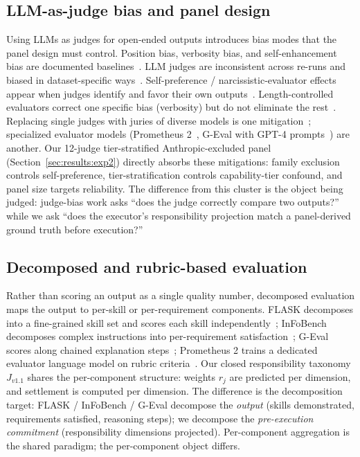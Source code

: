 \subsection{LLM-as-judge bias and panel design}
\label{sec:related:judge_bias}

Using LLMs as judges for open-ended outputs introduces bias modes that the panel design must control. Position bias, verbosity bias, and self-enhancement bias are documented baselines~\cite{zheng2023mtbench, wang2023notfair}. LLM judges are inconsistent across re-runs and biased in dataset-specific ways~\cite{stureborg2024inconsistent}. Self-preference / narcissistic-evaluator effects appear when judges identify and favor their own outputs~\cite{panickssery2024selfpref, koo2024narcissistic, wataoka2024selfpreference}. Length-controlled evaluators correct one specific bias (verbosity) but do not eliminate the rest~\cite{dubois2024lengthcontrolled}. Replacing single judges with juries of diverse models is one mitigation~\cite{verga2024juries}; specialized evaluator models (Prometheus 2~\cite{kim2024prometheus2}, G-Eval with GPT-4 prompts~\cite{liu2023geval}) are another. Our 12-judge tier-stratified Anthropic-excluded panel (Section~\ref{sec:results:exp2}) directly absorbs these mitigations: family exclusion controls self-preference, tier-stratification controls capability-tier confound, and panel size targets reliability. The difference from this cluster is the object being judged: judge-bias work asks ``does the judge correctly compare two outputs?'' while we ask ``does the executor's responsibility projection match a panel-derived ground truth before execution?''

\subsection{Decomposed and rubric-based evaluation}
\label{sec:related:decomposed}

Rather than scoring an output as a single quality number, decomposed evaluation maps the output to per-skill or per-requirement components. FLASK decomposes into a fine-grained skill set and scores each skill independently~\cite{ye2024flask}; InFoBench decomposes complex instructions into per-requirement satisfaction~\cite{qin2024infobench}; G-Eval scores along chained explanation steps~\cite{liu2023geval}; Prometheus 2 trains a dedicated evaluator language model on rubric criteria~\cite{kim2024prometheus2}. Our closed responsibility taxonomy $J_{v1.1}$ shares the per-component structure: weights $r_j$ are predicted per dimension, and settlement is computed per dimension. The difference is the decomposition target: FLASK / InFoBench / G-Eval decompose the \emph{output} (skills demonstrated, requirements satisfied, reasoning steps); we decompose the \emph{pre-execution commitment} (responsibility dimensions projected). Per-component aggregation is the shared paradigm; the per-component object differs.

